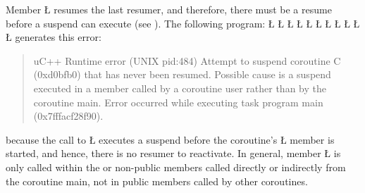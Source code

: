 \documentclass[openright,twoside]{report}
\begin{document}
Member \LGinlinetrue\LGbegin\lgrinde\L{}\endlgrinde\LGend{} resumes the last resumer, and therefore, there must be a resume before a suspend can execute (see ).
The following program:
\LGinlinefalse\LGbegin\lgrinde
\L{}
\L{\LB{}}
\L{}
\L{\LB{}}
\L{\LB{}}
\CE{}\L{\LB{}}
\L{\LB{\};}}
\L{}
\L{\LB{}}
\L{\LB{}}
\L{\LB{\}}}
\endlgrinde\LGend
generates this error:
\begin{quote}
\BGfont
uC++ Runtime error (UNIX pid:484) Attempt to suspend coroutine C (0xd0bfb0) that has never been resumed.
Possible cause is a suspend executed in a member called by a coroutine user rather than by the coroutine main.
Error occurred while executing task program main (0x7fffacf28f90).
\end{quote}
because the call to \LGinlinetrue\LGbegin\lgrinde\L{}\endlgrinde\LGend{} executes a suspend before the coroutine's \LGinlinetrue\LGbegin\lgrinde\L{}\endlgrinde\LGend{} member is started, and hence, there is no resumer to reactivate.
In general, member \LGinlinetrue\LGbegin\lgrinde\L{}\endlgrinde\LGend{} is only called within the  or non-public members called directly or indirectly from the coroutine main, not in public members called by other coroutines.
\end{document}

